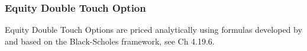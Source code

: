 \subsubsection{Equity Double Touch Option}
\label{pricing:eq_doubletouchoption}

Equity Double Touch Options are priced analytically using formulas developed by
\cite{Merton_1973} and \cite{Rubinstein_1991} based on the Black-Scholes framework,
see \cite{Haug_1997} Ch 4.19.6.